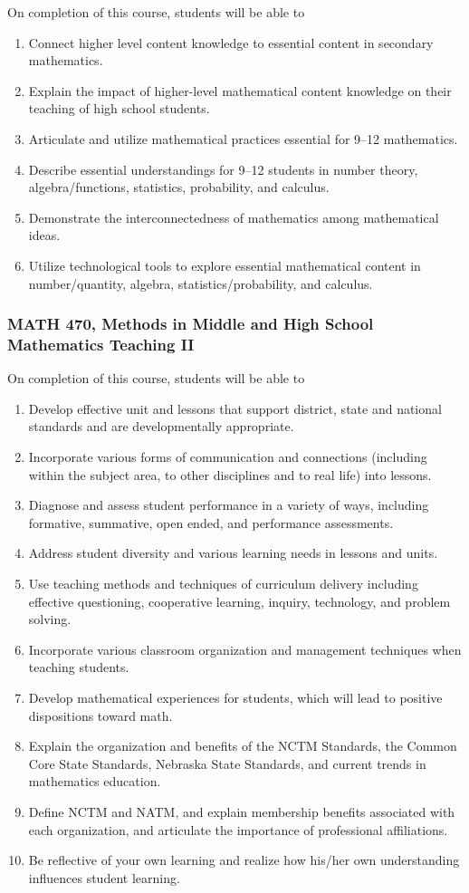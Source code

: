 \documentclass[11pt]{article}
\newenvironment{alphalist}{
\begin{enumerate}[label=(\arabic*),widest=107 ,leftmargin=25pt, itemsep=0pt]}
{\end{enumerate}}
\begin{document}
On  completion of this course, students will be able to
\begin{alphalist}

\item Connect higher level content knowledge to essential content in secondary mathematics.
\item Explain the impact of higher-level mathematical content knowledge on their teaching of high school students.
\item Articulate and utilize mathematical practices essential for 9--12 mathematics.
\item Describe essential understandings for 9--12 students in number theory, algebra/functions, statistics, probability, and calculus.
\item Demonstrate the interconnectedness of mathematics among mathematical ideas.
\item Utilize technological tools to explore essential mathematical content in number/quantity, algebra, statistics/probability, and calculus.
\end{alphalist}

\subsubsection{MATH 470, Methods in Middle and High School Mathematics Teaching II}

On completion of this course, students will be able to
\begin{alphalist}
\item Develop effective unit and lessons that support district, state and national standards and are developmentally appropriate.
\item Incorporate various forms of communication and connections (including within the subject area, to other disciplines and to real life) into lessons.
\item Diagnose and assess student performance in a variety of ways, including formative, summative, open ended, and performance assessments.
\item Address student diversity and various learning needs in lessons and units.
\item Use teaching methods and techniques of curriculum delivery including effective questioning, cooperative learning, inquiry, technology, and problem solving.
\item Incorporate various classroom organization and management techniques when teaching students.
\item Develop mathematical experiences for students, which will lead to positive dispositions toward math.
 \item Explain the organization and benefits of the NCTM Standards, the Common Core State Standards, Nebraska State Standards, and current trends in mathematics education.
\item Define NCTM and NATM, and explain membership benefits associated with each organization, and articulate the importance of professional affiliations.
\item Be reflective of your own learning and realize how his/her own understanding influences student learning.
\end{alphalist}
\end{document}

